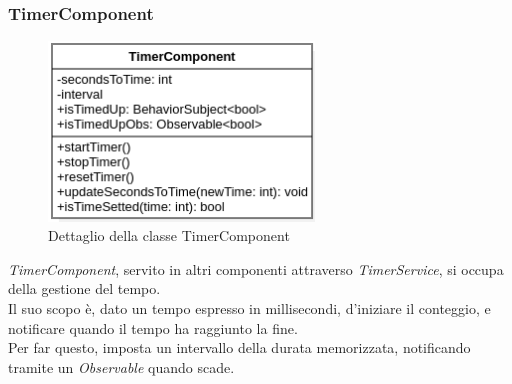\subsubsection{TimerComponent}
\begin{figure}[h]
    \centering
    \includegraphics[width=200pt]{images/prog/TimerComponent.png}
    \caption{Dettaglio della classe TimerComponent}
    \label{fig:timer}
\end{figure}
\emph{TimerComponent}, servito in altri componenti attraverso \emph{TimerService}, si occupa della gestione del tempo.\\ 
Il suo scopo è, dato un tempo espresso in millisecondi, d'iniziare il conteggio, e notificare quando il tempo ha raggiunto la fine.\\
Per far questo, imposta un intervallo della durata memorizzata, notificando tramite un \emph{Observable} quando scade.
